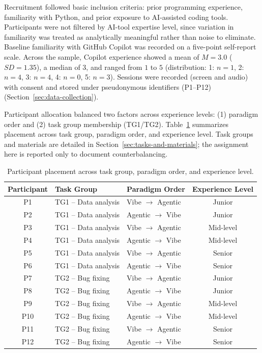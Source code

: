 Recruitment followed basic inclusion criteria: prior programming experience, familiarity with Python, and prior exposure to AI-assisted coding tools. Participants were not filtered by AI-tool expertise level, since variation in familiarity was treated as analytically meaningful rather than noise to eliminate. Baseline familiarity with GitHub Copilot was recorded on a five-point self-report scale. Across the sample, Copilot experience showed a mean of $M=3.0$ ($SD=1.35$), a median of $3$, and ranged from $1$ to $5$ (distribution: 1: $n=1$, 2: $n=4$, 3: $n=4$, 4: $n=0$, 5: $n=3$). Sessions were recorded (screen and audio) with consent and stored under pseudonymous identifiers (P1--P12) (Section~\ref{sec:data-collection}).

Participant allocation balanced two factors across experience levels: (1) paradigm order and (2) task group membership (TG1/TG2). Table~\ref{tab:counterbalancing} summarizes placement across task group, paradigm order, and experience level. Task groups and materials are detailed in Section~\ref{sec:tasks-and-materials}; the assignment here is reported only to document counterbalancing.

\begin{table}[H]
  \centering
  \caption[Participant Allocation]{Participant placement across task group, paradigm order, and experience level.}
  \label{tab:counterbalancing}
  \renewcommand{\arraystretch}{1.15}
  \begin{tabular}{c l l c}
    \toprule
    \rowcolor{accentblue}
    \textbf{Participant} & \textbf{Task Group} & \textbf{Paradigm Order} & \textbf{Experience Level} \\
    \midrule
    P1  & TG1 -- Data analysis & Vibe $\rightarrow$ Agentic & Junior \\
    P2  & TG1 -- Data analysis & Agentic $\rightarrow$ Vibe & Junior \\
    P3  & TG1 -- Data analysis & Vibe $\rightarrow$ Agentic & Mid-level \\
    P4  & TG1 -- Data analysis & Agentic $\rightarrow$ Vibe & Mid-level \\
    P5  & TG1 -- Data analysis & Vibe $\rightarrow$ Agentic & Senior \\
    P6  & TG1 -- Data analysis & Agentic $\rightarrow$ Vibe & Senior \\
    P7  & TG2 -- Bug fixing    & Vibe $\rightarrow$ Agentic & Junior \\
    P8  & TG2 -- Bug fixing    & Agentic $\rightarrow$ Vibe & Junior \\
    P9  & TG2 -- Bug fixing    & Vibe $\rightarrow$ Agentic & Mid-level \\
    P10 & TG2 -- Bug fixing    & Agentic $\rightarrow$ Vibe & Mid-level \\
    P11 & TG2 -- Bug fixing    & Vibe $\rightarrow$ Agentic & Senior \\
    P12 & TG2 -- Bug fixing    & Agentic $\rightarrow$ Vibe & Senior \\
    \bottomrule
  \end{tabular}
\end{table}

